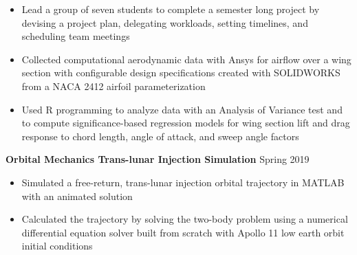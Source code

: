 \documentclass{article}
\begin{document}
\begin{itemize}
	\item Lead a group of seven students to complete a semester long project by devising a project plan, delegating workloads, setting timelines, and scheduling team meetings
	\item Collected computational aerodynamic data with Ansys for airflow over a wing section with configurable design specifications created with SOLIDWORKS from a NACA 2412 airfoil parameterization
	\item Used R programming to analyze data with an Analysis of Variance test and to compute significance-based regression models for wing section lift and drag response to chord length, angle of attack, and sweep angle factors
\end{itemize}
\vspace{0.5em}
\textbf{Orbital Mechanics Trans-lunar Injection Simulation} 
\hfill
Spring 2019
\vspace{0.5em}
\begin{itemize}
	\item Simulated a free-return, trans-lunar injection orbital trajectory in MATLAB with an animated solution
	\item Calculated the trajectory by solving the two-body problem using a numerical differential equation solver built from scratch with Apollo 11 low earth orbit initial conditions
\end{itemize}

\thispagestyle{empty}
\end{document}
